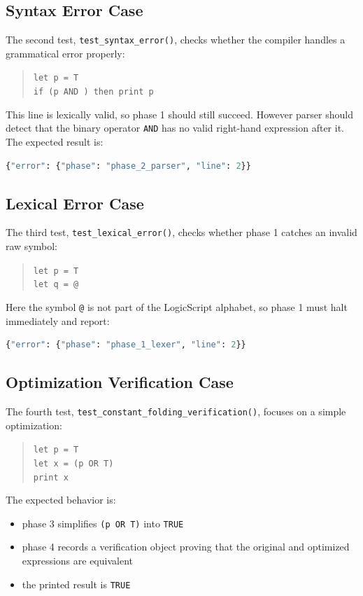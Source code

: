 \documentclass[11pt]{article}
\begin{document}
\subsection{Syntax Error Case}
The second test, \texttt{test\_syntax\_error()}, checks whether the compiler handles a grammatical error properly:
\begin{quote}
\texttt{let p = T}\\
\texttt{if (p AND ) then print p}
\end{quote}
This line is lexically valid, so phase 1 should still succeed. However parser should detect that the binary operator \texttt{AND} has no valid right-hand expression after it. The expected result is:
\begin{lstlisting}[language=Python]
{"error": {"phase": "phase_2_parser", "line": 2}}
\end{lstlisting}

\subsection{Lexical Error Case}
The third test, \texttt{test\_lexical\_error()}, checks whether phase 1 catches an invalid raw symbol:
\begin{quote}
\texttt{let p = T}\\
\texttt{let q = @}
\end{quote}
Here the symbol \texttt{@} is not part of the LogicScript alphabet, so phase 1 must halt immediately and report:
\begin{lstlisting}[language=Python]
{"error": {"phase": "phase_1_lexer", "line": 2}}
\end{lstlisting}

\subsection{Optimization Verification Case}
The fourth test, \texttt{test\_constant\_folding\_verification()}, focuses on a simple optimization:
\begin{quote}
\texttt{let p = T}\\
\texttt{let x = (p OR T)}\\
\texttt{print x}
\end{quote}
The expected behavior is:
\begin{itemize}
    \item phase 3 simplifies \texttt{(p OR T)} into \texttt{TRUE}
    \item phase 4 records a verification object proving that the original and optimized expressions are equivalent
    \item the printed result is \texttt{TRUE}
\end{itemize}
\end{document}
